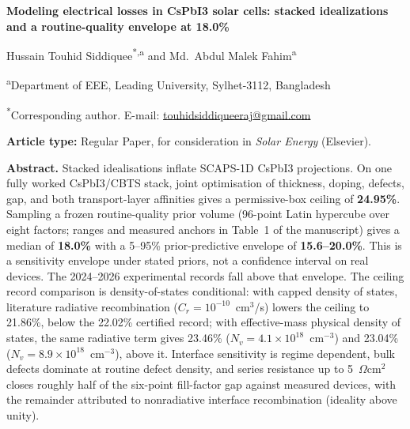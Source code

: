 \documentclass[11pt,a4paper]{article}
\begin{document}
\begin{center}
{\Large\bfseries Modeling electrical losses in CsPbI3 solar cells: stacked idealizations and a routine-quality envelope at 18.0\%}
\end{center}

\begin{center}
Hussain Touhid Siddiquee\textsuperscript{*,a} and Md.\ Abdul Malek Fahim\textsuperscript{a}
\end{center}

\begin{center}
\textsuperscript{a}Department of EEE, Leading University, Sylhet-3112, Bangladesh
\end{center}

\begin{center}
\textsuperscript{*}Corresponding author. E-mail: \url{touhidsiddiqueeraj@gmail.com}
\end{center}

\vspace{1em}
\noindent\textbf{Article type:} Regular Paper, for consideration in \textit{Solar Energy} (Elsevier).

\vspace{1em}
\noindent\textbf{Abstract.} Stacked idealisations inflate SCAPS-1D CsPbI3 projections. On one fully worked CsPbI3/CBTS stack, joint optimisation of thickness, doping, defects, gap, and both transport-layer affinities gives a permissive-box ceiling of \textbf{24.95\%}. Sampling a frozen routine-quality prior volume (96-point Latin hypercube over eight factors; ranges and measured anchors in Table~1 of the manuscript) gives a median of \textbf{18.0\%} with a 5--95\% prior-predictive envelope of \textbf{15.6--20.0\%}. This is a sensitivity envelope under stated priors, not a confidence interval on real devices. The 2024--2026 experimental records fall above that envelope. The ceiling record comparison is density-of-states conditional: with capped density of states, literature radiative recombination ($C_r=10^{-10}$~cm$^3$/s) lowers the ceiling to 21.86\%, below the 22.02\% certified record; with effective-mass physical density of states, the same radiative term gives 23.46\% ($N_v=4.1\times10^{18}$~cm$^{-3}$) and 23.04\% ($N_v=8.9\times10^{18}$~cm$^{-3}$), above it. Interface sensitivity is regime dependent, bulk defects dominate at routine defect density, and series resistance up to 5~$\Omega$cm$^2$ closes roughly half of the six-point fill-factor gap against measured devices, with the remainder attributed to nonradiative interface recombination (ideality above unity).
\end{document}
